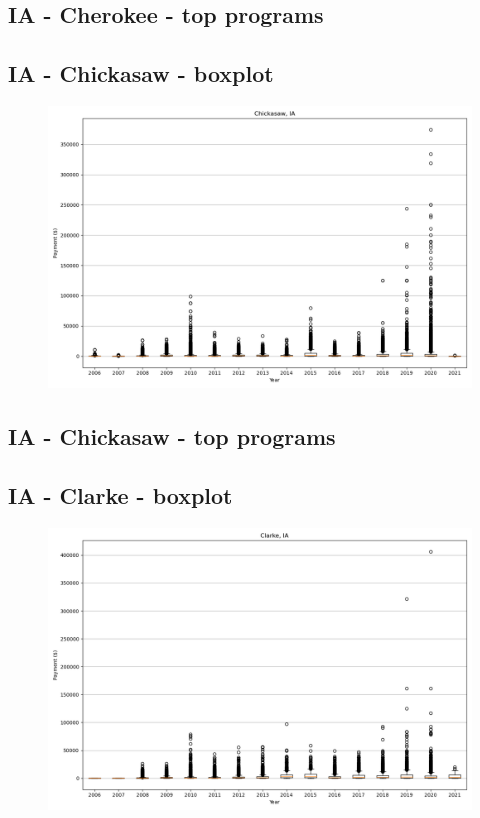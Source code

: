 \subsection*{IA - Cherokee - top programs}

\newpage
\subsection*{IA - Chickasaw - boxplot}
\begin{figure}[h]
\centering
\includegraphics[width=7in]{../output/boxplots/counties/Chickasaw-IA_boxplot.png}
\end{figure}


\subsection*{IA - Chickasaw - top programs}

\newpage
\subsection*{IA - Clarke - boxplot}
\begin{figure}[h]
\centering
\includegraphics[width=7in]{../output/boxplots/counties/Clarke-IA_boxplot.png}
\end{figure}


